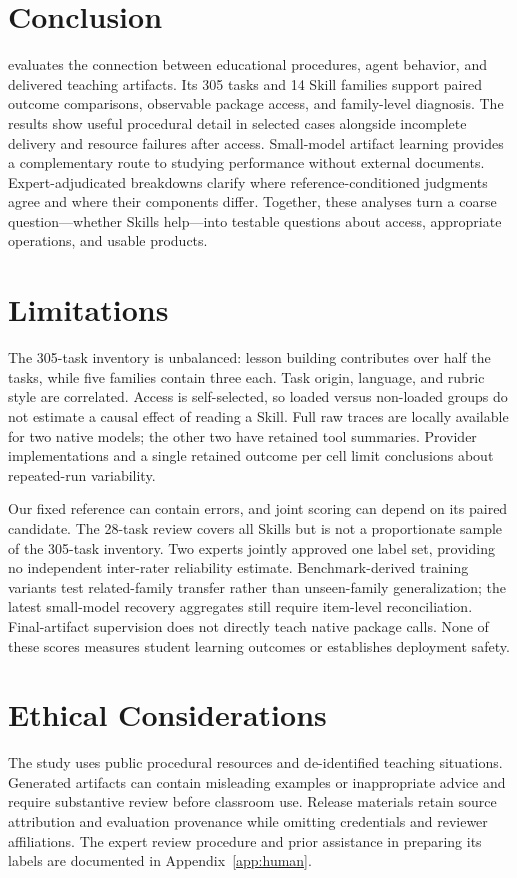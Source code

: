 \section{Conclusion}
\label{sec:discussion}
\bench{} evaluates the connection between educational procedures, agent
behavior, and delivered teaching artifacts. Its 305 tasks and 14 Skill
families support paired outcome comparisons, observable package access, and
family-level diagnosis. The results show useful procedural detail in selected
cases alongside incomplete delivery and resource failures after access.
Small-model artifact learning provides a complementary route to studying
performance without external documents. Expert-adjudicated breakdowns clarify
where reference-conditioned judgments agree and where their components differ.
Together, these analyses turn a coarse question---whether Skills help---into
testable questions about access, appropriate operations, and usable products.
\label{page:main-end}

\section*{Limitations}
The 305-task inventory is unbalanced: lesson building contributes over half
the tasks, while five families contain three each. Task origin, language, and
rubric style are correlated. Access is self-selected, so loaded versus
non-loaded groups do not estimate a causal effect of reading a Skill. Full
raw traces are locally available for two native models; the other two have
retained tool summaries. Provider implementations and a single retained outcome
per cell limit conclusions about repeated-run variability.

Our fixed reference can contain errors, and joint scoring can depend on its
paired candidate. The 28-task review covers all Skills but is not a
proportionate sample of the 305-task inventory. Two experts jointly approved
one label set, providing no independent inter-rater reliability estimate.
Benchmark-derived training variants test related-family transfer rather than
unseen-family generalization; the latest small-model recovery aggregates still
require item-level reconciliation. Final-artifact supervision does not directly
teach native package calls. None of these scores measures student learning
outcomes or establishes deployment safety.

\section*{Ethical Considerations}
The study uses public procedural resources and de-identified teaching
situations. Generated artifacts can contain misleading examples or
inappropriate advice and require substantive review before classroom use.
Release materials retain source attribution and evaluation provenance while
omitting credentials and reviewer affiliations. The expert review procedure
and prior assistance in preparing its labels are documented in
Appendix~\ref{app:human}.
